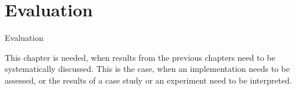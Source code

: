 \chapter{Evaluation}
\label{Evaluation}

Evaluation

This chapter is needed, when results from the previous chapters need to be systematically discussed. This is the case, when an implementation needs to be assessed, or the results of a case study or an experiment need to be interpreted.